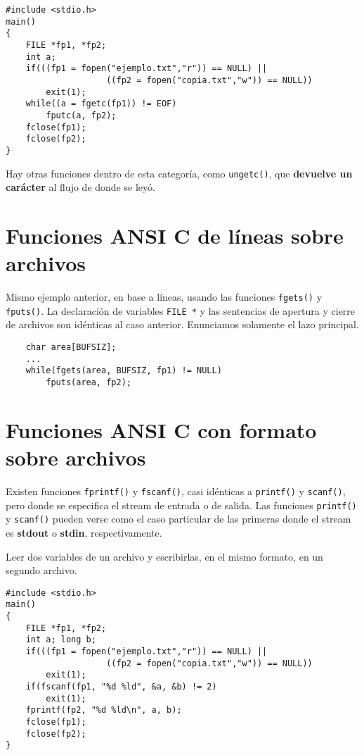 \begin{lstlisting}
#include <stdio.h>
main()
{
    FILE *fp1, *fp2;
    int a;
    if(((fp1 = fopen("ejemplo.txt","r")) == NULL) ||
                    ((fp2 = fopen("copia.txt","w")) == NULL))
        exit(1);
    while((a = fgetc(fp1)) != EOF)
        fputc(a, fp2);
    fclose(fp1);
    fclose(fp2);
}
\end{lstlisting}

Hay otras funciones dentro de esta categoría, como \lstinline{ungetc()}, que \textbf{devuelve un
carácter} al flujo de donde se leyó.

\section{Funciones ANSI C de líneas sobre archivos}
\label{subsubsec:esarchivosansiclineas}
Mismo ejemplo anterior, en base a líneas, usando las funciones \lstinline{fgets()} y \lstinline{fputs()}. La
declaración de variables \lstinline{FILE *} y las sentencias de apertura y cierre de
archivos son idénticas al caso anterior. Enunciamos solamente el lazo
principal.
    
\begin{lstlisting}
    char area[BUFSIZ];
    ...
    while(fgets(area, BUFSIZ, fp1) != NULL)
        fputs(area, fp2);
\end{lstlisting}

\section{Funciones ANSI C con formato sobre archivos}
\label{subsubsec:esarchivosansicformato}

Existen funciones \lstinline{fprintf()} y \lstinline{fscanf()}, casi idénticas a \lstinline{printf()} y \lstinline{scanf()},
pero donde se especifica el stream de entrada o de salida. Las funciones \lstinline{printf()} y \lstinline{scanf()} pueden verse como el caso particular de las primeras donde el
stream es \textbf{stdout} o \textbf{stdin}, respectivamente.

\begin{ejemplo}
Leer dos variables de un archivo y escribirlas, en el
mismo formato, en un segundo archivo.
\begin{lstlisting}
#include <stdio.h>
main()
{
    FILE *fp1, *fp2;
    int a; long b;
    if(((fp1 = fopen("ejemplo.txt","r")) == NULL) ||
                    ((fp2 = fopen("copia.txt","w")) == NULL))
        exit(1);
    if(fscanf(fp1, "%d %ld", &a, &b) != 2)
        exit(1);
    fprintf(fp2, "%d %ld\n", a, b);
    fclose(fp1);
    fclose(fp2);
}
\end{lstlisting}
\end{ejemplo}




